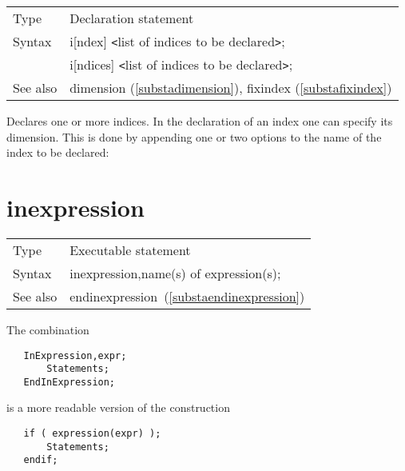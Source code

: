 \noindent \begin{tabular}{ll}
Type & Declaration statement\\
Syntax & i[ndex] {\tt<}list of indices to be declared{\tt>}; \\
       & i[ndices] {\tt<}list of indices to be declared{\tt>};
\\ See also & dimension (\ref{substadimension}),
              fixindex (\ref{substafixindex})
\end{tabular} \vspace{4mm}

\noindent Declares one or more indices. In the 
declaration of an index one can specify its dimension. 
This is done by appending one or two options to the name of the index to be 
declared:\vspace{4mm}


 \vspace{10mm}

 
\section{inexpression}
\label{substainexpression}

\noindent \begin{tabular}{ll}
Type & Executable statement\\
Syntax & inexpression,name(s) of expression(s);
\\ See also & endinexpression~(\ref{substaendinexpression})
\end{tabular} \vspace{4mm}

\noindent The combination
\begin{verbatim}
   InExpression,expr;
       Statements;
   EndInExpression;
\end{verbatim}
is a more readable version of the construction
\begin{verbatim}
   if ( expression(expr) );
       Statements;
   endif;
\end{verbatim}
\vspace{10mm}

